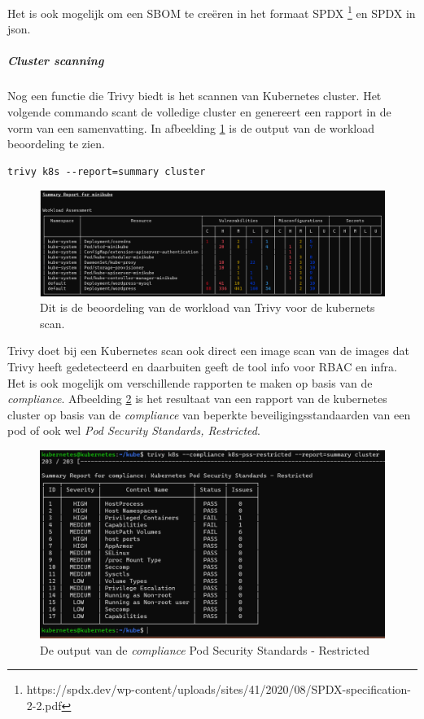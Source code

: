 Het is ook mogelijk om een SBOM te creëren in het formaat SPDX \footnote{https://spdx.dev/wp-content/uploads/sites/41/2020/08/SPDX-specification-2-2.pdf} en SPDX in json.


\subparagraph{Cluster scanning}
Nog een functie die Trivy biedt is het scannen van Kubernetes cluster. Het volgende commando scant de volledige cluster en genereert een rapport in de vorm van een samenvatting. In afbeelding \ref{fig:TrivyKubernetesClusterScan} is de output van de workload beoordeling te zien. 
\begin{lstlisting}[language=tex, caption={Scannen Kubernetes cluster met Trivy}]
trivy k8s --report=summary cluster
\end{lstlisting}

\begin{flushleft}
    \begin{figure}[h]
        \includegraphics[width=.95\textwidth]{graphics/outputK8SscanTrivy.png}
        \caption{\label{fig:TrivyKubernetesClusterScan}Dit is de beoordeling van de workload van Trivy voor de kubernets scan.}
    \end{figure} 
\end{flushleft}

Trivy doet bij een Kubernetes scan ook direct een image scan van de images dat Trivy heeft gedetecteerd en daarbuiten geeft de tool info voor RBAC en infra. Het is ook mogelijk om verschillende rapporten te maken op basis van de \textit{compliance}. Afbeelding \ref{fig:complianceRestricted} is het resultaat van een rapport van de kubernetes cluster op basis van de \textit{compliance} van beperkte beveiligingsstandaarden van een pod of ook wel \textit{Pod Security Standards, Restricted}.  

\begin{flushleft}
    \begin{figure}[h]
        \includegraphics[width=.95\textwidth]{graphics/complianceRestricted.png}
        \caption{\label{fig:complianceRestricted}De output van de \textit{compliance} Pod Security Standards - Restricted}
    \end{figure} 
\end{flushleft}




